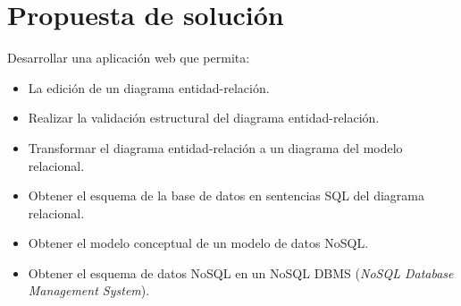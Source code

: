 \section{Propuesta de solución}

Desarrollar una aplicación web que permita:

\begin{itemize}
    \item La edición de un diagrama entidad-relación.
    \item Realizar la validación estructural del diagrama entidad-relación.
    \item Transformar el diagrama entidad-relación a un diagrama del modelo relacional.
    \item Obtener el esquema de la base de datos en sentencias SQL del diagrama relacional.
    \item Obtener el modelo conceptual de un modelo de datos NoSQL.
    \item Obtener el esquema de datos NoSQL en un NoSQL DBMS (\textit{NoSQL Database Management System}).
\end{itemize}